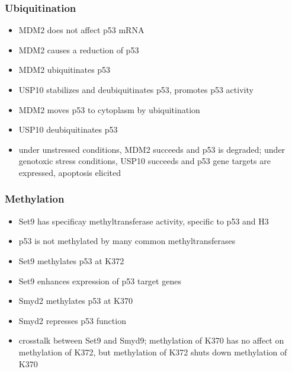 \documentclass[10pt]{article}
\begin{document}
\subsubsection*{Ubiquitination}
\begin{itemize}
  \item MDM2 does not affect p53 mRNA
  \item MDM2 causes a reduction of p53
  \item MDM2 ubiquitinates p53
  \item USP10 stabilizes and deubiquitinates p53, promotes p53 activity
  \item MDM2 moves p53 to cytoplasm by ubiquitination
  \item USP10 deubiquitinates p53
  \item under unstressed conditions, MDM2 succeeds and p53 is degraded; under genotoxic stress conditions, USP10 succeeds and p53 gene targets are expressed, apoptosis elicited
\end{itemize}

\subsubsection*{Methylation}
\begin{itemize}
  \item Set9 has specificay methyltransferase activity, specific to p53 and H3
  \item p53 is not methylated by many common methyltransferases
  \item Set9 methylates p53 at K372
  \item Set9 enhances expression of p53 target genes
  \item Smyd2 methylates p53 at K370
  \item Smyd2 represses p53 function
  \item crosstalk between Set9 and Smyd9; methylation of K370 has no affect on methylation of K372, but methylation of K372 shuts down methylation of K370
\end{itemize}
\end{document}
